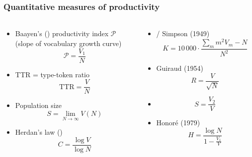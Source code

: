 \documentclass[t]{beamer} %
\begin{document}
\begin{frame}
  \frametitle{Quantitative measures of productivity}
  \framesubtitle{\citep{Tweedie:Baayen:98,Baayen:01}}

  \footnotesize
  \begin{columns}[c]
        \begin{column}{6cm}
      \ungap[1.2]
      \begin{itemize}
      \item Baayen's (\citeyear{Baayen:91}) productivity index $\mathcal{P}$\\
        (slope of vocabulary growth curve)
        \[
        \mathcal{P} = \frac{V_1}{N}
        \]
      \item TTR = type-token ratio
        \[
        \text{TTR} = \frac{V}{N}
        \]
      \item Population size
        \[
        S = \lim_{N \to \infty} V(N)
        \]
      \item Herdan's law (\citeyear{Herdan:64})
        \[
        C = \frac{\log V}{\log N}
        \]
      \end{itemize}
    \end{column}
    \begin{column}{6cm}
      \begin{itemize}
      \item<2-> \citet{Yule:44} /  Simpson (1949) 
        \[
          K = 10\,000\cdot \frac{\sum_m m^2 V_m - N}{N^2}
        \]
      \item<2-> Guiraud (1954)
        \[
          R = \frac{V}{\sqrt{N}}
        \]
      \item<2-> \citet{Sichel:75}
        \[
          S = \frac{V_2}{V}
        \]
      \item<2-> Honoré (1979)
        \[
          H = \frac{\log N}{1 - \frac{V_1}{V}}
        \]
      \end{itemize}
    \end{column}
  \end{columns}  
\end{frame}
\end{document}
